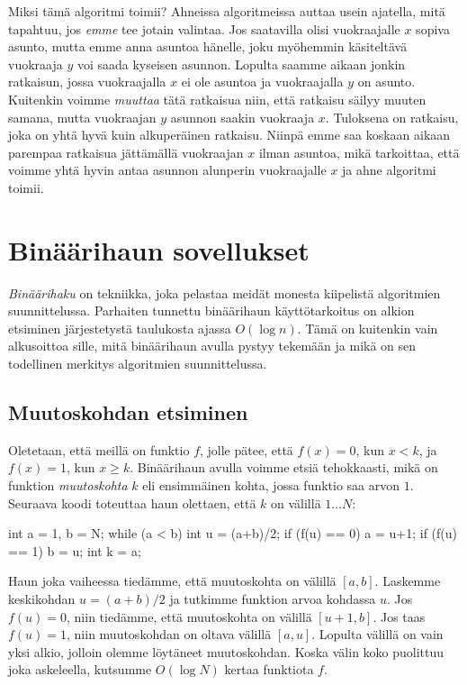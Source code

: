Miksi tämä algoritmi toimii?
Ahneissa algoritmeissa auttaa usein ajatella,
mitä tapahtuu, jos \emph{emme} tee jotain valintaa.
Jos saatavilla olisi vuokraajalle $x$ sopiva asunto,
mutta emme anna asuntoa hänelle,
joku myöhemmin käsiteltävä vuokraaja $y$ voi saada kyseisen asunnon.
Lopulta saamme aikaan jonkin ratkaisun, jossa
vuokraajalla $x$ ei ole asuntoa ja vuokraajalla $y$ on asunto.
Kuitenkin voimme \emph{muuttaa} tätä ratkaisua niin,
että ratkaisu säilyy muuten samana, mutta vuokraajan $y$
asunnon saakin vuokraaja $x$.
Tuloksena on ratkaisu, joka on yhtä hyvä kuin alkuperäinen ratkaisu.
Niinpä emme saa koskaan aikaan parempaa ratkaisua
jättämällä vuokraajan $x$ ilman asuntoa,
mikä tarkoittaa, että voimme yhtä hyvin antaa asunnon alunperin
vuokraajalle $x$ ja ahne algoritmi toimii.

\section{Binäärihaun sovellukset}

\emph{Binäärihaku} on tekniikka, joka pelastaa meidät monesta
kiipelistä algoritmien suunnittelussa.
Parhaiten tunnettu binäärihaun käyttötarkoitus on alkion
etsiminen järjestetystä taulukosta ajassa $O(\log n)$.
Tämä on kuitenkin vain alkusoittoa sille,
mitä binäärihaun avulla pystyy tekemään ja mikä on sen
todellinen merkitys algoritmien suunnittelussa.

\subsection{Muutoskohdan etsiminen}

Oletetaan, että meillä on funktio $f$,
jolle pätee, että $f(x)=0$, kun $x<k$,
ja $f(x)=1$, kun $x \ge k$.
Binäärihaun avulla voimme etsiä tehokkaasti,
mikä on funktion \emph{muutoskohta} $k$
eli ensimmäinen kohta, jossa funktio saa arvon $1$.
Seuraava koodi toteuttaa haun olettaen,
että $k$ on välillä $1 \dots N$:


\begin{code}
int a = 1, b = N;
while (a < b) {
    int u = (a+b)/2;
    if (f(u) == 0) a = u+1;
    if (f(u) == 1) b = u;
}
int k = a;
\end{code}

Haun joka vaiheessa tiedämme, että muutoskohta on välillä $[a,b]$.
Laskemme keskikohdan $u=(a+b)/2$ ja tutkimme funktion arvoa kohdassa $u$.
Jos $f(u)=0$, niin tiedämme, että muutoskohta on välillä $[u+1,b]$.
Jos taas $f(u)=1$, niin muutoskohdan on oltava välillä $[a,u]$.
Lopulta välillä on vain yksi alkio, jolloin olemme löytäneet muutoskohdan.
Koska välin koko puolittuu joka askeleella,
kutsumme $O(\log N)$ kertaa funktiota $f$.

